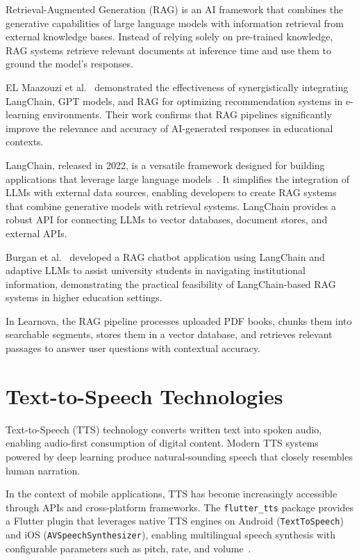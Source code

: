 Retrieval-Augmented Generation (RAG) is an AI framework that combines the
generative capabilities of large language models with information retrieval
from external knowledge bases. Instead of relying solely on pre-trained
knowledge, RAG systems retrieve relevant documents at inference time and use
them to ground the model's responses.

EL Maazouzi et al.~\cite{elmaazouzi2024} demonstrated the effectiveness of
synergistically integrating LangChain, GPT models, and RAG for optimizing
recommendation systems in e-learning environments. Their work confirms that
RAG pipelines significantly improve the relevance and accuracy of AI-generated
responses in educational contexts.

LangChain, released in 2022, is a versatile framework designed for building
applications that leverage large language models~\cite{langchainsurvey2024}.
It simplifies the integration of LLMs with external data sources, enabling
developers to create RAG systems that combine generative models with
retrieval systems. LangChain provides a robust API for connecting LLMs to
vector databases, document stores, and external APIs.

Burgan et al.~\cite{burgan2024} developed a RAG chatbot application using
LangChain and adaptive LLMs to assist university students in navigating
institutional information, demonstrating the practical feasibility of
LangChain-based RAG systems in higher education settings.

In Learnova, the RAG pipeline processes uploaded PDF books, chunks them into
searchable segments, stores them in a vector database, and retrieves relevant
passages to answer user questions with contextual accuracy.

\section{Text-to-Speech Technologies}
\label{sec:tts}

Text-to-Speech (TTS) technology converts written text into spoken audio,
enabling audio-first consumption of digital content. Modern TTS systems
powered by deep learning produce natural-sounding speech that closely
resembles human narration.

In the context of mobile applications, TTS has become increasingly accessible
through APIs and cross-platform frameworks. The \texttt{flutter\_tts} package
provides a Flutter plugin that leverages native TTS engines on Android
(\texttt{TextToSpeech}) and iOS (\texttt{AVSpeechSynthesizer}), enabling
multilingual speech synthesis with configurable parameters such as pitch,
rate, and volume~\cite{fluttertts2023}.


